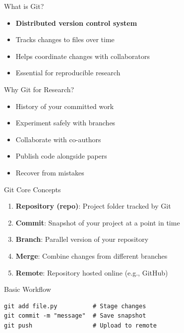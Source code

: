 \documentclass[11pt,aspectratio=169]{beamer}
\begin{document}
\begin{frame}{What is Git?}
\begin{itemize}
    \item \textbf{Distributed version control system}
    \item Tracks changes to files over time
    \item Helps coordinate changes with collaborators
    \item Essential for reproducible research
\end{itemize}

\vspace{0.5cm}

\begin{block}{Why Git for Research?}
\begin{itemize}
    \item History of your committed work
    \item Experiment safely with branches
    \item Collaborate with co-authors
    \item Publish code alongside papers
    \item Recover from mistakes
\end{itemize}
\end{block}
\end{frame}


\begin{frame}[fragile]{Git Core Concepts}
\begin{enumerate}
    \item \textbf{Repository (repo)}: Project folder tracked by Git

    \item \textbf{Commit}: Snapshot of your project at a point in time

    \item \textbf{Branch}: Parallel version of your repository

    \item \textbf{Merge}: Combine changes from different branches

    \item \textbf{Remote}: Repository hosted online (e.g., GitHub)
\end{enumerate}

\vspace{0.3cm}

\begin{block}{Basic Workflow}
\begin{verbatim}
git add file.py          # Stage changes
git commit -m "message"  # Save snapshot
git push                 # Upload to remote
\end{verbatim}
\end{block}
\end{frame}
\end{document}
